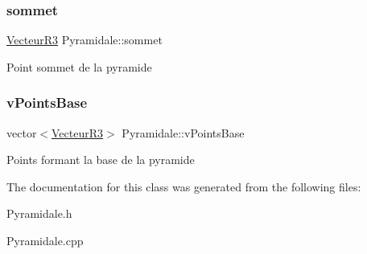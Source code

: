 \subsubsection{\texorpdfstring{sommet}{sommet}}
{\footnotesize\ttfamily \mbox{\hyperlink{class_vecteur_r3}{Vecteur\+R3}} Pyramidale\+::sommet\hspace{0.3cm}{\ttfamily [protected]}}

Point sommet de la pyramide \mbox{\label{class_pyramidale_a3c8f1d8480417e91a65daa4f6d55c0ed}} 
\subsubsection{\texorpdfstring{v\+Points\+Base}{vPointsBase}}
{\footnotesize\ttfamily vector$<$\mbox{\hyperlink{class_vecteur_r3}{Vecteur\+R3}}$>$ Pyramidale\+::v\+Points\+Base\hspace{0.3cm}{\ttfamily [protected]}}

Points formant la base de la pyramide 

The documentation for this class was generated from the following files\+:\begin{DoxyCompactItemize}
\item 
Pyramidale.\+h\item 
Pyramidale.\+cpp\end{DoxyCompactItemize}
